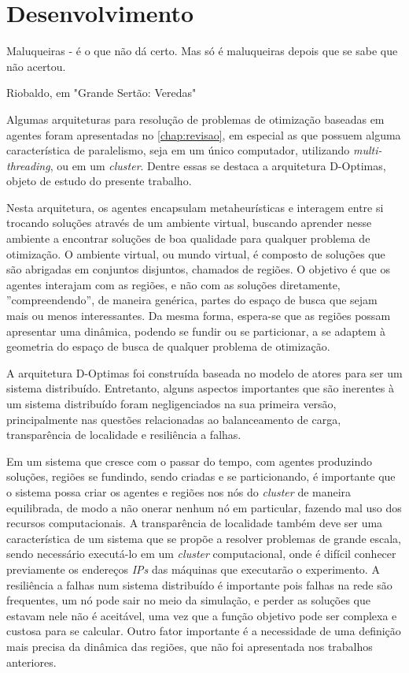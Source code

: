 

\chapter{Desenvolvimento}
\label{chap:desenvolvimento}

\epigraph{Maluqueiras - é o que não dá certo. Mas só é maluqueiras depois que se sabe que não acertou.}{Riobaldo, em "Grande Sertão: Veredas"}

Algumas arquiteturas para resolução de problemas de otimização baseadas em agentes foram apresentadas no \autoref{chap:revisao}, em especial as que possuem alguma característica de paralelismo, seja em um único computador, utilizando \textit{multi-threading}, ou em um \textit{cluster}. Dentre essas se destaca a arquitetura D-Optimas, objeto de estudo do presente trabalho. 

Nesta arquitetura, os agentes encapsulam metaheurísticas e interagem entre si trocando soluções através de um ambiente virtual, buscando aprender nesse ambiente a encontrar soluções de boa qualidade para qualquer problema de otimização. O ambiente virtual, ou mundo virtual, é composto de soluções que são abrigadas em conjuntos disjuntos, chamados de regiões. O objetivo é que os agentes interajam com as regiões, e não com as soluções diretamente, ''compreendendo'', de maneira genérica, partes do espaço de busca que sejam mais ou menos interessantes. Da mesma forma, espera-se que as regiões possam apresentar uma dinâmica, podendo se fundir ou se particionar, a se adaptem à geometria do espaço de busca de qualquer problema de otimização.   

A arquitetura D-Optimas foi construída baseada no modelo de atores para ser um sistema distribuído. Entretanto, alguns aspectos importantes que são inerentes à um sistema distribuído foram negligenciados na sua primeira versão, principalmente nas questões relacionadas ao balanceamento de carga, transparência de localidade e resiliência a falhas.

Em um sistema que cresce com o passar do tempo, com agentes produzindo soluções, regiões se fundindo, sendo criadas e se particionando, é importante que o sistema possa criar os agentes e regiões nos nós do \textit{cluster} de maneira equilibrada, de modo a não onerar nenhum nó em particular, fazendo mal uso dos recursos computacionais. A transparência de localidade também deve ser uma característica de um sistema que se propõe a resolver problemas de grande escala, sendo necessário executá-lo em um \textit{cluster} computacional, onde é difícil conhecer previamente os endereços \textit{IPs} das máquinas que executarão o experimento. A resiliência a falhas num sistema distribuído é importante pois falhas na rede são frequentes, um nó pode sair no meio da simulação, e perder as soluções que estavam nele não é aceitável, uma vez que a função objetivo pode ser complexa e custosa para se calcular.
Outro fator importante é a necessidade de uma definição mais precisa da dinâmica das regiões,  que não foi apresentada nos trabalhos anteriores.

